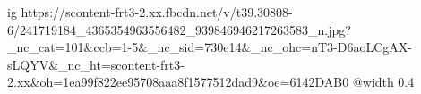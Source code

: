  
 
 
 
 

\ifcmt
  ig https://scontent-frt3-2.xx.fbcdn.net/v/t39.30808-6/241719184_4365354963556482_939846946217263583_n.jpg?_nc_cat=101&ccb=1-5&_nc_sid=730e14&_nc_ohc=nT3-D6aoLCgAX-sLQYV&_nc_ht=scontent-frt3-2.xx&oh=1ea99f822ee95708aaa8f1577512dad9&oe=6142DAB0
  @width 0.4
\fi
